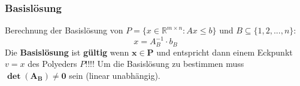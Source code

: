     
  \subsubsection{Basislösung}
  	Berechnung der Basislösung von $P = \{ x \in \mathbb{R}^{m\times n} : A x \leq b \}$ und $B\subseteq \{1,2,...,n\}$:
  	\[ x = A_B^{-1} \cdot b_B \]
  	Die \textbf{Basislösung} ist \textbf{gültig} wenn $\mathbf{x \in P}$ und entspricht dann einem Eckpunkt $v=x$ des Polyeders $P$!!!!
    Um die Basislösung zu bestimmen muss $\mathbf{\det(A_B)\neq 0}$ sein (linear unabhängig).
    
    
